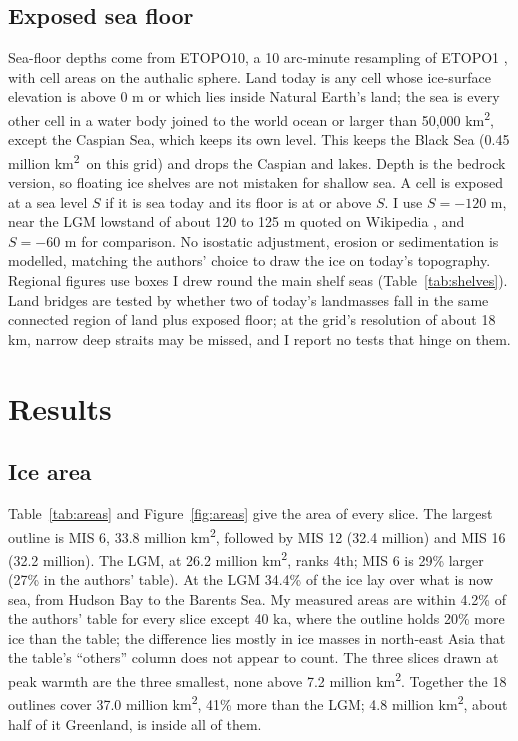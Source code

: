 \documentclass[11pt,a4paper]{article}
\newcommand{\kmq}{km\textsuperscript{2}}
\begin{document}
\subsection{Exposed sea floor}
Sea-floor depths come from ETOPO10, a 10 arc-minute resampling of ETOPO1 \citep{etopo1}, with cell areas on the authalic sphere. Land today is any cell whose ice-surface elevation is above 0 m or which lies inside Natural Earth's land; the sea is every other cell in a water body joined to the world ocean or larger than 50,000 \kmq, except the Caspian Sea, which keeps its own level. This keeps the Black Sea (0.45 million \kmq\ on this grid) and drops the Caspian and lakes. Depth is the bedrock version, so floating ice shelves are not mistaken for shallow sea. A cell is exposed at a sea level $S$ if it is sea today and its floor is at or above $S$. I use $S=-120$ m, near the LGM lowstand of about 120 to 125 m quoted on Wikipedia \citep{wiki}, and $S=-60$ m for comparison. No isostatic adjustment, erosion or sedimentation is modelled, matching the authors' choice to draw the ice on today's topography. Regional figures use boxes I drew round the main shelf seas (Table~\ref{tab:shelves}). Land bridges are tested by whether two of today's landmasses fall in the same connected region of land plus exposed floor; at the grid's resolution of about 18 km, narrow deep straits may be missed, and I report no tests that hinge on them.

\section{Results}
\subsection{Ice area}
Table~\ref{tab:areas} and Figure~\ref{fig:areas} give the area of every slice. The largest outline is MIS 6, 33.8 million \kmq, followed by MIS 12 (32.4 million) and MIS 16 (32.2 million). The LGM, at 26.2 million \kmq, ranks 4th; MIS 6 is 29\% larger (27\% in the authors' table). At the LGM 34.4\% of the ice lay over what is now sea, from Hudson Bay to the Barents Sea. My measured areas are within 4.2\% of the authors' table for every slice except 40 ka, where the outline holds 20\% more ice than the table; the difference lies mostly in ice masses in north-east Asia that the table's ``others'' column does not appear to count. The three slices drawn at peak warmth are the three smallest, none above 7.2 million \kmq. Together the 18 outlines cover 37.0 million \kmq, 41\% more than the LGM; 4.8 million \kmq, about half of it Greenland, is inside all of them.
\end{document}
